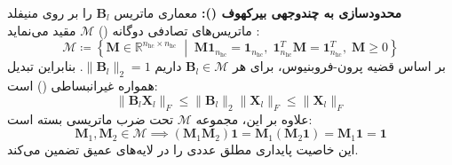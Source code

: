 \textbf{محدودسازی به چندوجهی بیرکهوف ():}
معماری  ماتریس $\mathbf{B}_l$ را بر روی منیفلد ماتریس‌های تصادفی دوگانه () $\mathcal{M}$ مقید می‌نماید \cite{xie2026mhc}:
\begin{equation}
    \mathcal{M} \coloneqq \left\{ \mathbf{M} \in \mathbb{R}^{n_{\text{hc}} \times n_{\text{hc}}} \;\middle|\; \mathbf{M} \mathbf{1}_{n_{\text{hc}}} = \mathbf{1}_{n_{\text{hc}}}, \; \mathbf{1}_{n_{\text{hc}}}^T \mathbf{M} = \mathbf{1}_{n_{\text{hc}}}^T, \; \mathbf{M} \ge 0 \right\}
\end{equation}
بر اساس قضیه پرون-فروبنیوس، برای هر $\mathbf{B}_l \in \mathcal{M}$ داریم $\|\mathbf{B}_l\|_2 = 1$. بنابراین تبدیل همواره غیرانبساطی () است:
\begin{equation}
    \|\mathbf{B}_l \mathbf{X}_l\|_F \le \|\mathbf{B}_l\|_2 \|\mathbf{X}_l\|_F \le \|\mathbf{X}_l\|_F
\end{equation}
علاوه بر این، مجموعه $\mathcal{M}$ تحت ضرب ماتریسی بسته است:
\begin{equation}
    \mathbf{M}_1, \mathbf{M}_2 \in \mathcal{M} \implies (\mathbf{M}_1 \mathbf{M}_2)\mathbf{1} = \mathbf{M}_1 (\mathbf{M}_2 \mathbf{1}) = \mathbf{M}_1 \mathbf{1} = \mathbf{1}
\end{equation}
این خاصیت پایداری مطلق عددی را در لایه‌های عمیق تضمین می‌کند.

